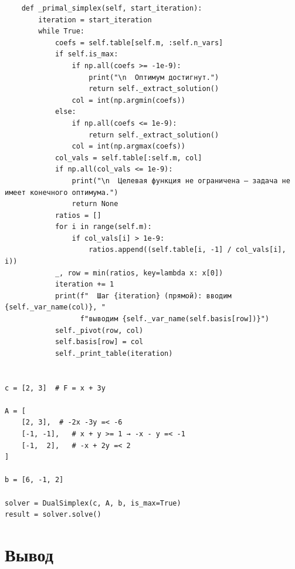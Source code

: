 \documentclass[oneside,a4paper,14pt]{extarticle}
\begin{document}
\begin{verbatim}
    def _primal_simplex(self, start_iteration):
        iteration = start_iteration
        while True:
            coefs = self.table[self.m, :self.n_vars]
            if self.is_max:
                if np.all(coefs >= -1e-9):
                    print("\n  Оптимум достигнут.")
                    return self._extract_solution()
                col = int(np.argmin(coefs))
            else:
                if np.all(coefs <= 1e-9):
                    return self._extract_solution()
                col = int(np.argmax(coefs))
            col_vals = self.table[:self.m, col]
            if np.all(col_vals <= 1e-9):
                print("\n  Целевая функция не ограничена — задача не имеет конечного оптимума.")
                return None
            ratios = []
            for i in range(self.m):
                if col_vals[i] > 1e-9:
                    ratios.append((self.table[i, -1] / col_vals[i], i))
            _, row = min(ratios, key=lambda x: x[0])
            iteration += 1
            print(f"  Шаг {iteration} (прямой): вводим {self._var_name(col)}, "
                  f"выводим {self._var_name(self.basis[row])}")
            self._pivot(row, col)
            self.basis[row] = col
            self._print_table(iteration)


c = [2, 3]  # F = x + 3y

A = [
    [2, 3],  # -2x -3y =< -6
    [-1, -1],   # x + y >= 1 → -x - y =< -1
    [-1,  2],   # -x + 2y =< 2
]

b = [6, -1, 2]

solver = DualSimplex(c, A, b, is_max=True)
result = solver.solve()

\end{verbatim}

\newpage
\section*{Вывод}
\end{document}
